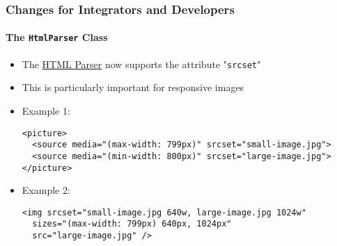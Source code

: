 %

\begin{frame}[fragile]
	\frametitle{Changes for Integrators and Developers}
	\framesubtitle{The \texttt{HtmlParser} Class}


	\begin{itemize}
		\item The
			\href{https://docs.typo3.org/m/typo3/reference-coreapi/master/en-us/ApiOverview/Examples/ParsingHtml/Index.html}{HTML Parser}
			now supports the attribute "\texttt{srcset}"
		\item This is particularly important for responsive images
		\item Example 1:
\begin{lstlisting}
<picture>
  <source media="(max-width: 799px)" srcset="small-image.jpg">
  <source media="(min-width: 800px)" srcset="large-image.jpg">
</picture>
\end{lstlisting}
		\item Example 2:
\begin{lstlisting}
<img srcset="small-image.jpg 640w, large-image.jpg 1024w"
  sizes="(max-width: 799px) 640px, 1024px"
  src="large-image.jpg" />
\end{lstlisting}

	\end{itemize}

\end{frame}

